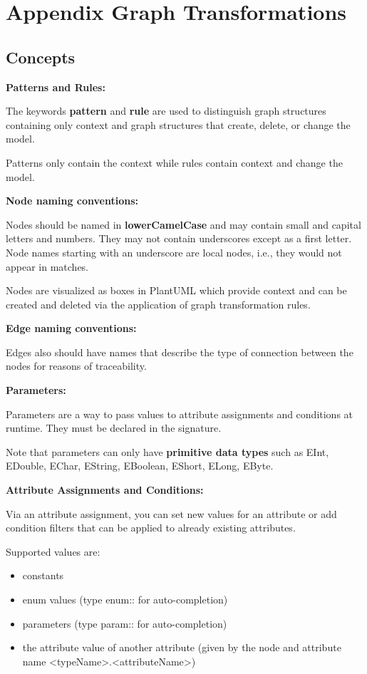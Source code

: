 \section{Appendix Graph Transformations}

\subsection{Concepts}

\textbf{Patterns and Rules:}

The keywords \textbf{pattern} and \textbf{rule} are used to distinguish graph structures containing only context and graph structures that create, delete, or change the model.

Patterns only contain the context while rules contain context and change the model.\newline

\textbf{Node naming conventions:}

Nodes should be named in \textbf{lowerCamelCase} and may contain small and capital letters and numbers. They may not contain underscores except as a first letter. Node names starting with an underscore are local nodes, i.e., they would not appear in matches.

Nodes are visualized as boxes in PlantUML which provide context and can be created and deleted via the application of graph transformation rules.\newline

\textbf{Edge naming conventions:}

Edges also should have names that describe the type of connection between the nodes for reasons of traceability.\newline

\textbf{Parameters:}

Parameters are a way to pass values to attribute assignments and conditions at runtime. They must be declared in the signature.

Note that parameters can only have \textbf{primitive data types} such as EInt, EDouble, EChar, EString, EBoolean, EShort, ELong, EByte.\newline

\textbf{Attribute Assignments and Conditions:}

Via an attribute assignment, you can set new values for an attribute or add condition filters that can be applied to already existing attributes.

Supported values are:
\begin{itemize}

\item constants 
\item enum values (type enum:: for auto-completion)
\item parameters (type param:: for auto-completion)
\item the attribute value of another attribute \newline (given by the node and attribute name <typeName>.<attributeName>)

\end{itemize}

